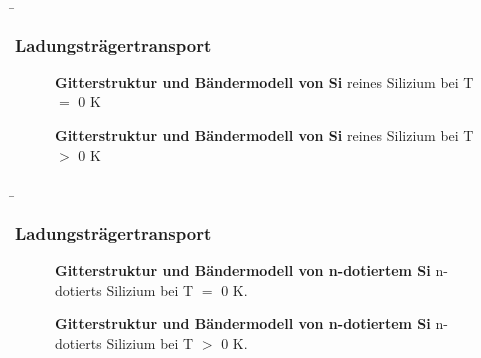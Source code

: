 \begin{frame}
    \b{
    \frametitle{Ladungsträgertransport}
    \begin{minipage}[t]{0.48\textwidth}
        \begin{figure}[H]
            \centering
            
            \caption{\textbf{Gitterstruktur und Bändermodell von Si} reines Silizium bei T $=$ 0 K}  
            \label{fig:GitterstrukturUndBaendermodellVonSi-1}
        \end{figure}
    \end{minipage}
    \begin{minipage}[t]{0.48\textwidth}
        \begin{figure}[H]
            \centering
            
            \caption{\textbf{Gitterstruktur und Bändermodell von Si} reines Silizium bei T $>$ 0 K}  
            \label{fig:GitterstrukturUndBaendermodellVonSi-2}
        \end{figure}
    \end{minipage}
    }

\end{frame}

\begin{frame}
    \b{\frametitle{Ladungsträgertransport}
        \begin{minipage}[t]{0.48\textwidth}
            \begin{figure}[H]
                \centering
                
                \caption{\textbf{Gitterstruktur und Bändermodell von n-dotiertem Si} n-dotierts Silizium bei T $=$ 0 K.}  
                \label{fig:GitterstrukturUndBaendermodellVonN-DotiertesSi-1}
            \end{figure}
        \end{minipage}
        \begin{minipage}[t]{0.48\textwidth}
            \begin{figure}[H]
                \centering
                
                \caption{\textbf{Gitterstruktur und Bändermodell von n-dotiertem Si} n-dotierts Silizium bei T $>$ 0 K.}  
                \label{fig:GitterstrukturUndBaendermodellVonN-DotiertesSi-2}
            \end{figure}
        \end{minipage}
    }

\end{frame}

